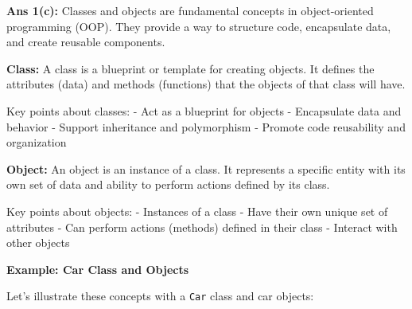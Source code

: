 \textbf{Ans 1(c):} Classes and objects are fundamental concepts in
object-oriented programming (OOP). They provide a way to structure code,
encapsulate data, and create reusable components.

\textbf{Class:} A class is a blueprint or template for creating objects.
It defines the attributes (data) and methods (functions) that the
objects of that class will have.

Key points about classes: - Act as a blueprint for objects - Encapsulate
data and behavior - Support inheritance and polymorphism - Promote code
reusability and organization

\textbf{Object:} An object is an instance of a class. It represents a
specific entity with its own set of data and ability to perform actions
defined by its class.

Key points about objects: - Instances of a class - Have their own unique
set of attributes - Can perform actions (methods) defined in their class
- Interact with other objects

\textbf{Example: Car Class and Objects}

Let's illustrate these concepts with a \texttt{Car} class and car
objects:

